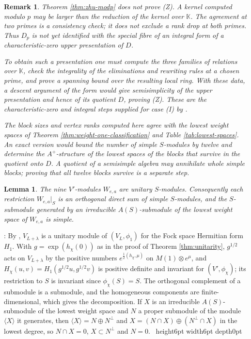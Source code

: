 \documentclass[leqno]{article}
\newcommand{\K}{\ensuremath{\mathbb{K}}}
\newcommand{\qed}{\hfill \vrule height6pt  width6pt depth0pt}
\newcommand{\ot}{\otimes}
\newtheorem{lemma}[thm]{Lemma}
\newtheorem{remark}[thm]{Remark}
\newenvironment{proof}[1][]{\noindent {\it Proof #1} : }{\hbox{~}\qed
\smallskip
}
\numberwithin{equation}{section}
\begin{document}
\begin{remark}\normalfont
\label{rem:zhu-status}
Theorem \ref{thm:zhu-modp} does not prove (Z). A kernel computed modulo $p$ may be larger than the reduction of the kernel over $\K$. The agreement at two primes is a consistency check; it does not exclude a rank drop at both primes. Thus $D_p$ is not yet identified with the special fibre of an integral form of a characteristic-zero upper presentation of $D$.

To obtain such a presentation one must compute the three families of relations over $\K$, check the integrality of the eliminations and rewriting rules at a chosen prime, and prove a spanning bound over the resulting local ring. With these data, a descent argument of the form \cite[Lemma 9.6]{Rie26b} would give semisimplicity of the upper presentation and hence of its quotient $D$, proving (Z). These are the characteristic-zero and integral steps supplied for case (I) by \cite[Sections 9.8--9.10]{Rie26b}.

The block sizes and vertex ranks computed here agree with the lowest weight spaces of Theorem \ref{thm:weight-one-classification} and Table \ref{tab:lowest-spaces}. An exact version would bound the number of simple $S$-modules by twelve and determine the $A^+$-structure of the lowest spaces of the blocks that survive in the quotient onto $D$. A quotient of a semisimple algebra may annihilate whole simple blocks; proving that all twelve blocks survive is a separate step.
\end{remark}

\begin{lemma}
\label{lem:lattice-modules-unitary}
The nine $V'$-modules $W_{e,a}$ are unitary $S$-modules. Consequently each restriction $W_{e,a}|_S$ is an orthogonal direct sum of simple $S$-modules, and the $S$-submodule generated by an irreducible $A(S)$-submodule of the lowest weight space of $W_{e,a}$ is simple.
\end{lemma}

\begin{proof}
By \cite[Theorem 4.12]{DoL14}, $V_{L+\lambda}$ is a unitary module of $(V_L, \phi_1)$ for the Fock space Hermitian form $H_1$. With $g = \exp(h_\chi(0))$ as in the proof of Theorem \ref{thm:unitarity}, $g^{1/2}$ acts on $V_{L+\lambda}$ by the positive numbers $e^{\frac12(h_\chi,\mu)}$ on $M(1) \ot e^\mu$, and $H_\chi(u,v) = H_1(g^{1/2}u,g^{1/2}v)$ is positive definite and invariant for $(V', \phi_\chi)$; its restriction to $S$ is invariant since $\phi_\chi(S) = S$. The orthogonal complement of a submodule is a submodule, and the homogeneous components are finite-dimensional, which gives the decomposition. If $X$ is an irreducible $A(S)$-submodule of the lowest weight space and $N$ a proper submodule of the module $\langle X\rangle$ it generates, then $\langle X\rangle = N \oplus N^\perp$ and $X = (N \cap X) \oplus (N^\perp \cap X)$ in the lowest degree, so $N \cap X = 0$, $X \subset N^\perp$ and $N = 0$.
\end{proof}
\end{document}
